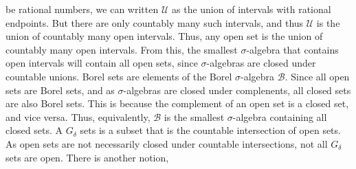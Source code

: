         be rational numbers, we can written $\mathcal{U}$ as the
        union of intervals with rational endpoints. But there are
        only countably many such intervals, and thus
        $\mathcal{U}$ is the union of countably many open
        intervals. Thus, any open set is the union of countably
        many open intervals. From this, the smallest
        $\sigma$-algebra that contains open intervals will contain
        all open sets, since $\sigma$-algebras are closed under
        countable unions. Borel sets are elements of the
        Borel $\sigma$-algebra $\mathcal{B}$. Since all open
        sets are Borel sets, and as $\sigma$-algebras are closed
        under complenents, all closed sets are also Borel sets.
        This is because the complement of an open set is a closed
        set, and vice versa. Thus, equivalently, $\mathcal{B}$ is
        the smallest $\sigma$-algebra containing all closed sets.
        A $G_{\delta}$ sets is a subset that is the countable
        intersection of open sets. As open sets are not
        necessarily closed under countable intersections, not
        all $G_{\delta}$ sets are open. There is another notion,